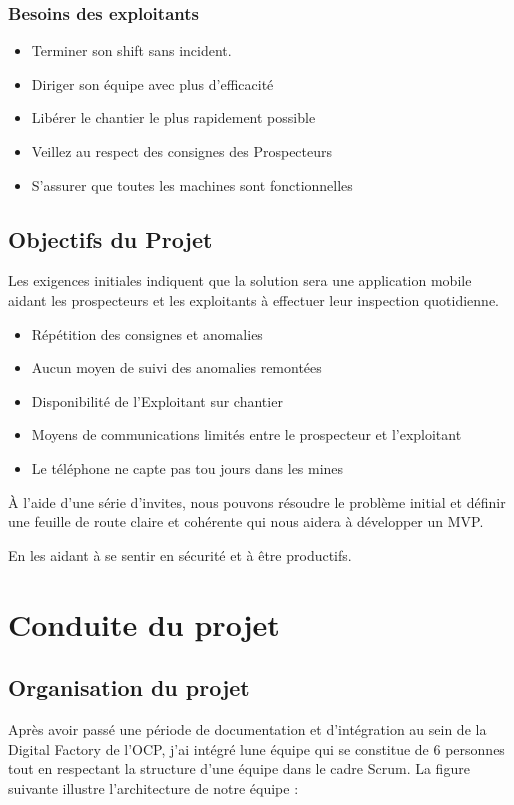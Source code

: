 \subsubsection{Besoins des exploitants}
\begin{itemize}
\item Terminer son shift sans incident.
\item Diriger son \'equipe avec plus d'efficacit\'e
\item Lib\'erer le chantier le plus rapidement possible
\item Veillez au respect des consignes des Prospecteurs
\item S'assurer que toutes les machines sont fonctionnelles
\end{itemize}

\subsection{Objectifs du Projet}

Les exigences initiales indiquent que la solution sera une application mobile aidant les prospecteurs et les exploitants \`a effectuer leur inspection quotidienne.

\begin{itemize}
\item R\'ep\'etition des consignes et anomalies
\item Aucun moyen de suivi des anomalies remont\'ees 
\item Disponibilit\'e de l'Exploitant sur chantier
\item Moyens de communications limit\'es entre le prospecteur et l'exploitant
\item Le t\'el\'ephone ne capte pas tou jours dans les mines 
\end{itemize}

\`A l'aide d'une s\'erie d'invites, nous pouvons r\'esoudre le probl\`eme initial et d\'efinir une feuille de route claire et coh\'erente qui nous aidera \`a d\'evelopper un MVP.

En les aidant \`a se sentir en s\'ecurit\'e et \`a \^etre productifs.

\section{Conduite du projet}
\subsection{Organisation du projet}
Apr\`es avoir pass\'e une p\'eriode de documentation et d'int\'egration au sein de la Digital Factory de l'OCP, j'ai int\'egr\'e lune \'equipe qui se constitue de 6 personnes tout en respectant la structure d'une \'equipe dans le cadre Scrum.
La figure suivante illustre l'architecture de notre \'equipe :

